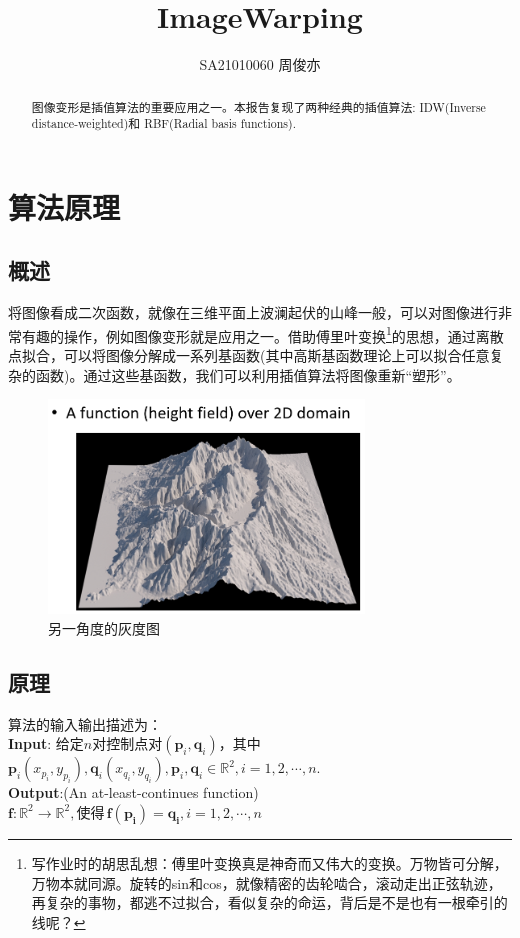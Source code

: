\documentclass[12pt]{article}
\title{\LARGE\textbf{ImageWarping}}
\author{SA21010060 周俊亦}
\date{}
\begin{document}
	\maketitle
	\renewcommand{\abstractname}{Abstract}
	\begin{abstract}
		图像变形是插值算法的重要应用之一。本报告复现了两种经典的插值算法: IDW(Inverse distance-weighted)和 RBF(Radial basis functions).
	\end{abstract}
	
	\section{算法原理}
		\subsection{概述}
		将图像看成二次函数，就像在三维平面上波澜起伏的山峰一般，可以对图像进行非常有趣的操作，例如图像变形就是应用之一。借助傅里叶变换\footnote{写作业时的胡思乱想：傅里叶变换真是神奇而又伟大的变换。万物皆可分解，万物本就同源。旋转的sin和cos，就像精密的齿轮啮合，滚动走出正弦轨迹，再复杂的事物，都逃不过拟合，看似复杂的命运，背后是不是也有一根牵引的线呢？}的思想，通过离散点拟合，可以将图像分解成一系列基函数(其中高斯基函数理论上可以拟合任意复杂的函数)。通过这些基函数，我们可以利用插值算法将图像重新“塑形”。
		
		
		
		\begin{figure}[H]
			\centering
			\includegraphics[width=3.3in]{./ppt1.png}
			\centering
			\caption{另一角度的灰度图}
		\end{figure}
	
		\subsection{原理}
		算法的输入输出描述为：\\
		\textbf{Input}: 给定$n$对控制点对$(\textbf{p}_i,\textbf{q}_i)$，其中
		$\textbf{p}_i(x_{p_i},y_{p_i}),\textbf{q}_i(x_{q_i},y_{q_i}),\textbf{p}_i,\textbf{q}_i\in \mathbb{R}^{2}, i=1,2, \cdots, n$.\\
		\textbf{Output}:\space(An at-least-continues function)\space$\mathbf{f}: \mathbb{R}^{2} \rightarrow \mathbb{R}^{2}, \text {使得} \,\mathbf{f}\left(\mathbf{p}_{\mathbf{i}}\right)=\mathbf{q}_{\mathbf{i}},i=1,2, \cdots, n$
		
\end{document}
